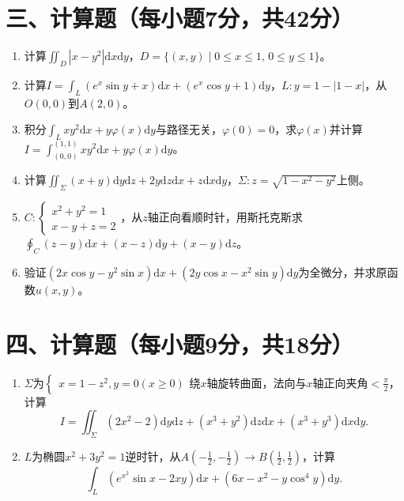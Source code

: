 \documentclass[12pt,a4paper]{ctexart}
\begin{document}
\vspace{1cm}

\section*{三、计算题（每小题7分，共42分）}
\begin{enumerate}
\item 计算$\iint_{D}|x-y^{2}| \mathrm{d}x\mathrm{d}y$，$D=\{(x,y)\mid 0\le x\le1,\,0\le y\le1\}$。

\item 计算$I=\int_{L}(e^{x} \sin y+x) \mathrm{d}x+(e^{x} \cos y+1)\mathrm{d}y$，$L:y=1-|1-x|$，从$O(0,0)$到$A(2,0)$。

\item 积分$\int_{L} x y^{2}\mathrm{d}x+y \varphi(x)\mathrm{d}y$与路径无关，$\varphi(0)=0$，求$\varphi(x)$并计算$I=\int_{(0,0)}^{(1,1)} x y^{2}\mathrm{d}x+y \varphi(x)\mathrm{d}y$。

\item 计算$\iint_{\Sigma }(x+y) \mathrm{d}y\mathrm{d}z+2y \mathrm{d}z\mathrm{d}x+z \mathrm{d}x\mathrm{d}y$，$\Sigma:z=\sqrt{1-x^{2}-y^{2}}$上侧。

\item $C:\begin{cases}x^{2}+y^{2}=1\\x-y+z=2\end{cases}$，从$z$轴正向看顺时针，用斯托克斯求$\oint_{C}(z-y)\mathrm{d}x+(x-z)\mathrm{d}y+(x-y)\mathrm{d}z$。

\item 验证$(2 x \cos y-y^{2} \sin x) \mathrm{d}x+(2 y \cos x-x^{2} \sin y) \mathrm{d}y$为全微分，并求原函数$u(x,y)$。
\end{enumerate}

\vspace{1cm}

\section*{四、计算题（每小题9分，共18分）}
\begin{enumerate}
\item $\Sigma$为$\begin{cases}x=1-z^{2},y=0(x\ge0)\end{cases}$绕$x$轴旋转曲面，法向与$x$轴正向夹角$<\frac{\pi}{2}$，计算
\[
I=\iint_{\Sigma }(2 x^{2}-2) \mathrm{d}y \mathrm{d}z+(x^{3}+y^{2}) \mathrm{d}z \mathrm{d}x+(x^{3}+y^{3}) \mathrm{d}x \mathrm{d}y.
\]

\item $L$为椭圆$x^2+3y^2=1$逆时针，从$A(-\frac{1}{2},-\frac{1}{2})\to B(\frac{1}{2},\frac{1}{2})$，计算
\[
\int_{L}(e^{x^{2}} \sin x-2 x y) \mathrm{d}x+(6 x-x^{2}-y \cos ^{4} y) \mathrm{d}y.
\]
\end{enumerate}
\end{document}
